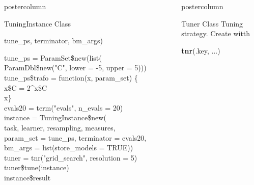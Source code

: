 \documentclass{beamer}
\newlength{\columnheight} %
\newcommand{\codeinline}[1]{\begin{codeboxinline}#1\end{codeboxinline}}
\begin{document}
\begin{frame}[fragile]{}
\begin{columns}
\begin{column}{.245\textwidth}
\begin{beamercolorbox}[center]{postercolumn}
\begin{minipage}{.98\textwidth}
{\begin{myblock}{TuningInstance Class}
\begin{codeboxmultiline}[width=23.7cm]
								\hspace*{1ex}tune\_ps, terminator, bm\_args)
							\end{codeboxmultiline}
							\vspace{1em}
							\begin{codeboxexample}
								{\footnotesize
									tune\_ps = ParamSet\$new(list(\\
									\hspace*{1ex} ParamDbl\$new("C", lower = -5, upper = 5)))
									tune\_ps\$trafo = function(x, param\_set) \{\\
									\hspace*{1ex} x\$C = 2\textasciicircum x\$C\\
									\hspace*{1ex} x\}\\
									evals20 = term("evals", n\_evals = 20)
									\vspace{1em}
									\\
									instance = TuningInstance\$new(\\
									\hspace*{1ex} task, learner, resampling, measures,\\
									\hspace*{1ex} param\_set = tune\_ps, terminator = evals20,\\
									\hspace*{1ex} bm\_args = list(store\_models = TRUE))\\
									tuner = tnr("grid\_search", resolution = 5)
									\vspace{1em}
									\\
									tuner\$tune(instance)\\
									instance\$result}
							\end{codeboxexample}
						\end{myblock}
						\vfill}
				\end{minipage}
			\end{beamercolorbox}
		\end{column}
		\begin{column}{.245\textwidth}
			\begin{beamercolorbox}[center]{postercolumn}
				\begin{minipage}{.98\textwidth}
					\parbox[t][\columnheight]{\textwidth}{
						\begin{myblock}{Tuner Class}
                            Tuning strategy. Create witth \codeinline{\textbf{tnr}(.key, ...)}
							\\

\end{myblock}}
\end{minipage}
\end{beamercolorbox}
\end{column}
\end{columns}
\end{frame}
\end{document}
